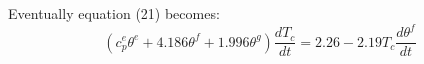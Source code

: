 Eventually equation (21) becomes:
\begin{equation}
(c_p^e \theta^e + 4.186 \theta^f + 1.996 \theta^g) \frac{dT_c}{dt} = 2.26 - 2.19 T_c \frac{d\theta^f}{dt}
\end{equation}